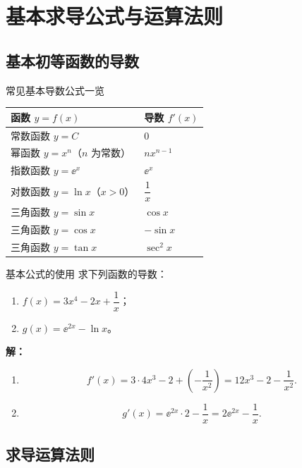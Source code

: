 \documentclass[a4paper,11pt]{ctexart}
\begin{document}
\section{基本求导公式与运算法则}

\subsection{基本初等函数的导数}

\begin{summarybox}{常见基本导数公式一览}
\begin{center}
\begin{tabular}{ll}
\toprule
函数 $y=f(x)$ & 导数 $f'(x)$ \\
\midrule
常数函数 $y=C$ & $0$ \\
幂函数 $y=x^n$（$n$ 为常数） & $nx^{n-1}$ \\
指数函数 $y=\ee^x$ & $\ee^x$ \\
对数函数 $y=\ln x$（$x>0$） & $\dfrac{1}{x}$ \\
三角函数 $y=\sin x$ & $\cos x$ \\
三角函数 $y=\cos x$ & $-\sin x$ \\
三角函数 $y=\tan x$ & $\sec^2 x$ \\
\bottomrule
\end{tabular}
\end{center}
\end{summarybox}

\begin{examplebox}{基本公式的使用}
求下列函数的导数：
\begin{enumerate}
  \item $f(x)=3x^4-2x+\dfrac{1}{x}$；
  \item $g(x)=\ee^{2x}-\ln x$。
\end{enumerate}
\textbf{解：}
\begin{enumerate}
  \item
  \[
    f'(x)=3\cdot4x^3-2+\left(-\dfrac{1}{x^2}\right)=12x^3-2-\dfrac{1}{x^2}.
  \]
  \item
  \[
    g'(x)=\ee^{2x}\cdot 2 - \dfrac{1}{x}=2\ee^{2x}-\dfrac{1}{x}.
  \]
\end{enumerate}
\end{examplebox}

\subsection{求导运算法则}
\end{document}
